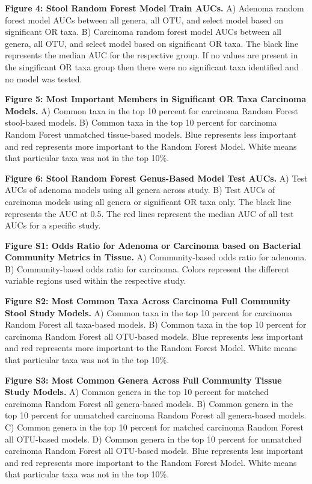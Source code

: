 \documentclass[12pt,]{article}
\begin{document}
\textbf{Figure 4: Stool Random Forest Model Train AUCs.} A) Adenoma
random forest model AUCs between all genera, all OTU, and select model
based on significant OR taxa. B) Carcinoma random forest model AUCs
between all genera, all OTU, and select model based on significant OR
taxa. The black line represents the median AUC for the respective group.
If no values are present in the singificant OR taxa group then there
were no significant taxa identified and no model was tested.

\textbf{Figure 5: Most Important Members in Significant OR Taxa
Carcinoma Models.} A) Common taxa in the top 10 percent for carcinoma
Random Forest stool-based models. B) Common taxa in the top 10 percent
for carcinoma Random Forest unmatched tissue-based models. Blue
represents less important and red represents more important to the
Random Forest Model. White means that particular taxa was not in the top
10\%.

\textbf{Figure 6: Stool Random Forest Genus-Based Model Test AUCs.} A)
Test AUCs of adenoma models using all genera across study. B) Test AUCs
of carcinoma models using all genera or significant OR taxa only. The
black line represents the AUC at 0.5. The red lines represent the median
AUC of all test AUCs for a specific study.

\newpage

\textbf{Figure S1: Odds Ratio for Adenoma or Carcinoma based on
Bacterial Community Metrics in Tissue.} A) Community-based odds ratio
for adenoma. B) Community-based odds ratio for carcinoma. Colors
represent the different variable regions used within the respective
study.

\textbf{Figure S2: Most Common Taxa Across Carcinoma Full Community
Stool Study Models.} A) Common taxa in the top 10 percent for carcinoma
Random Forest all taxa-based models. B) Common taxa in the top 10
percent for carcinoma Random Forest all OTU-based models. Blue
represents less important and red represents more important to the
Random Forest Model. White means that particular taxa was not in the top
10\%.

\textbf{Figure S3: Most Common Genera Across Full Community Tissue Study
Models.} A) Common genera in the top 10 percent for matched carcinoma
Random Forest all genera-based models. B) Common genera in the top 10
percent for unmatched carcinoma Random Forest all genera-based models.
C) Common genera in the top 10 percent for matched carcinoma Random
Forest all OTU-based models. D) Common genera in the top 10 percent for
unmatched carcinoma Random Forest all OTU-based models. Blue represents
less important and red represents more important to the Random Forest
Model. White means that particular taxa was not in the top 10\%.
\end{document}
